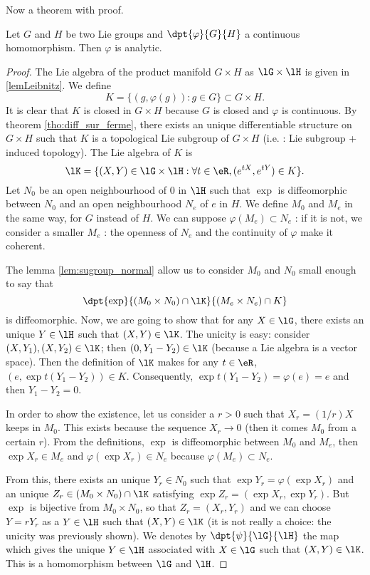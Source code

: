 Now a theorem with proof.

\begin{theorem}
Let $G$ and $H$ be two Lie groups and $\dpt{\varphi}{G}{H}$ a continuous homomorphism. Then $\varphi$ is analytic.
\end{theorem}

\begin{proof}
The Lie algebra of the product manifold $G\times H$ as $\lG\times\lH$ is given in \ref{lemLeibnitz}. We define
\begin{equation}
  K=\{(g,\varphi(g)):g\in G\}\subset G\times H.
\end{equation}
It is clear that $K$ is closed in $G\times H$ because $G$ is closed and $\varphi$ is continuous.
By theorem \ref{tho:diff_sur_ferme}, there exists an unique differentiable structure on $G\times H$ such that $K$ is a topological Lie subgroup of $G\times H$ (i.e. : Lie subgroup + induced topology). The Lie algebra of $K$ is
\begin{equation}
  \lK=\{(X,Y)\in\lG\times\lH:\forall t\in\eR, (e^{tX},e^{tY})\in K\}.
\end{equation}
Let $N_0$ be an open neighbourhood of $0$ in $\lH$ such that $\exp$ is diffeomorphic between $N_0$ and an open neighbourhood $N_e$ of $e$ in $H$. We define $M_0$ and $M_e$ in the same way, for $G$ instead of $H$. We can suppose $\varphi(M_e)\subset N_e$ : if it is not, we consider a smaller $M_e$ : the openness of $N_e$ and the continuity of $\varphi$ make it coherent.

The lemma \ref{lem:sugroup_normal} allow us to consider $M_0$ and $N_0$ small enough to say that 
\[
   \dpt{\exp}{(M_0\times N_0)\cap\lK}{(M_e\times N_e)\cap K}
\]
is diffeomorphic. Now, we are going to show that for any $X\in\lG$, there exists an unique $Y\in\lH$ such that $(X,Y)\in\lK$. The unicity is easy: consider $(X,Y_1),(X,Y_2)\in\lK$; then $(0,Y_1-Y_2)\in\lK$ (because a Lie algebra is a vector space). Then the definition of $\lK$ makes for any $t\in\eR$, $(e,\exp{t(Y_1-Y_2)})\in K$. Consequently, $\exp t(Y_1-Y_2)=\varphi(e)=e$ and then $Y_1-Y_2=0$.

In order to show the existence, let us consider a $r>0$ such that $X_r=(1/r)X$ keeps in $M_0$. This exists because the sequence $X_r\to 0$ (then it comes $M_0$ from a certain $r$). From the definitions, $\exp$ is diffeomorphic between $M_0$ and $M_e$, then $\exp X_r\in M_e$ and $\varphi(\exp X_r)\in N_e$ because $\varphi(M_e)\subset N_e$.

From this, there exists an unique $Y_r\in N_0$ such that $\exp Y_r=\varphi(\exp X_r)$ and an unique $Z_r\in(M_0\times N_0)\cap\lK$ satisfying  $\exp Z_r=(\exp X_r,\exp Y_r)$. But $\exp$ is bijective from $M_0\times N_0$, so that $Z_r=(X_r,Y_r)$ and we can choose $Y=rY_r$ as a $Y\in\lH$ such that $(X,Y)\in\lK$ (it is not really a choice: the unicity was previously shown). We denotes by $\dpt{\psi}{\lG}{\lH}$ the map which gives the unique $Y\in\lH$ associated with $X\in\lG$ such that $(X,Y)\in\lK$. This is a homomorphism between $\lG$ and $\lH$.


\end{proof}
